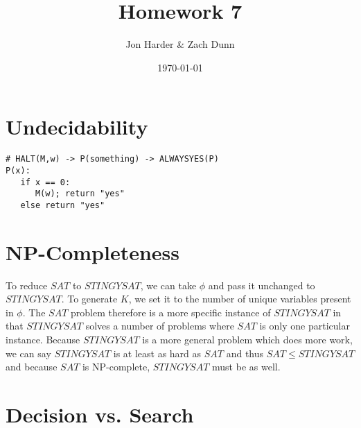 \documentclass[11pt, letterpaper]{article}
\author{Jon Harder \& Zach Dunn}
\date{\today}
\title{Homework 7}
\begin{document}
\maketitle
\section{Undecidability}

\begin{verbatim}
# HALT(M,w) -> P(something) -> ALWAYSYES(P)
P(x):
   if x == 0:
      M(w); return "yes"
   else return "yes"
\end{verbatim}


\section{NP-Completeness}
To reduce $SAT$ to $STINGYSAT$, we can take $\phi$ and pass it unchanged to $STINGYSAT$.  To
generate $K$, we set it to the number of unique variables present in $\phi$. The $SAT$ problem
therefore is a more specific instance of $STINGYSAT$ in that $STINGYSAT$ solves a number of problems
where $SAT$ is only one particular instance.  Because $STINGYSAT$ is a more general problem which
does more work, we can say $STINGYSAT$ is at least as hard as $SAT$ and thus $SAT \leq STINGYSAT$
and because $SAT$ is NP-complete, $STINGYSAT$ must be as well.\\

\section{Decision vs. Search}
\end{document}
